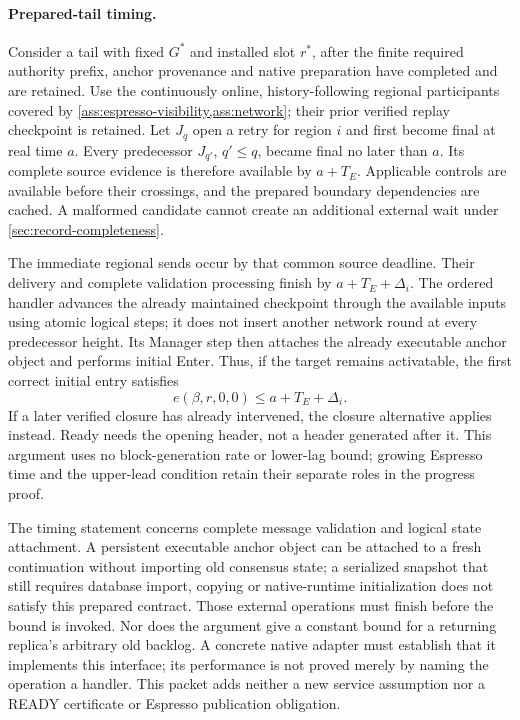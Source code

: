 \paragraph{Prepared-tail timing.}
\label{sec:source-step-timing}
Consider a tail with fixed $G^*$ and installed slot $r^*$, after the
finite required authority prefix, anchor provenance and native
preparation have completed and are retained. Use the continuously
online, history-following regional participants covered by
\cref{ass:espresso-visibility,ass:network}; their prior verified replay
checkpoint is retained. Let $J_q$ open a retry for region $i$ and first
become final at real time $a$. Every predecessor $J_{q'}$, $q'\le q$,
became final no later than $a$. Its complete source evidence is therefore
available by $a+T_E$. Applicable controls are available before their
crossings, and the prepared boundary dependencies are cached. A
malformed candidate cannot create an additional external wait under
\cref{sec:record-completeness}.

The immediate regional sends occur by that common source deadline.
Their delivery and complete validation processing finish by
$a+T_E+\Delta_i$. The ordered handler advances the already maintained
checkpoint through the available inputs using atomic logical steps;
it does not insert another network round at every predecessor height.
Its Manager step then attaches the already executable anchor object
and performs initial Enter. Thus, if the target remains activatable,
the first correct initial entry satisfies
\[
 e(\beta,r,0,0)\le a+T_E+\Delta_i.
\]
If a later verified closure has already intervened, the closure
alternative applies instead. Ready needs the opening header, not a
header generated after it. This argument uses no block-generation rate
or lower-lag bound; growing Espresso time and the upper-lead condition
retain their separate roles in the progress proof.

The timing statement concerns complete message validation and logical
state attachment. A persistent executable anchor object can be attached
to a fresh continuation without importing old consensus state; a
serialized snapshot that still requires database import, copying or
native-runtime initialization does not satisfy this prepared contract.
Those external operations must finish before the bound is invoked.
Nor does the argument give a constant bound for a returning replica's
arbitrary old backlog. A concrete native adapter must establish that it
implements this interface; its performance is not proved merely by
naming the operation a handler. This packet adds neither a new service
assumption nor a READY certificate or Espresso publication obligation.
